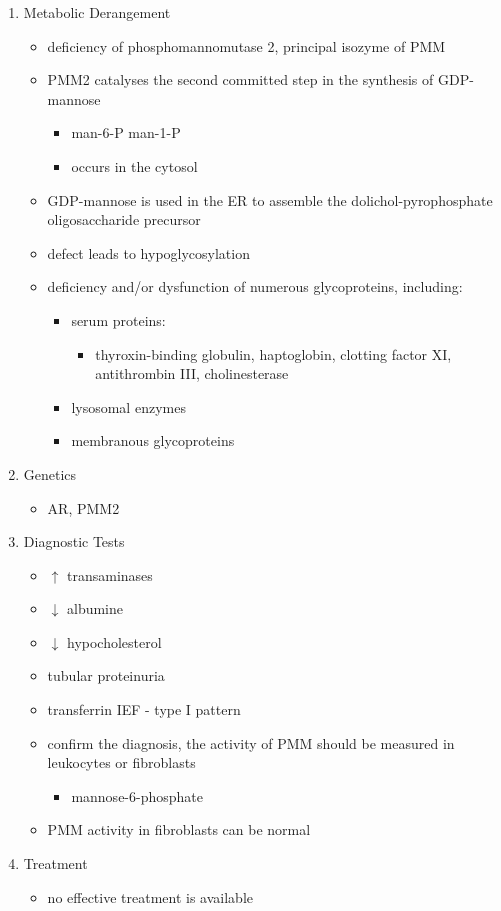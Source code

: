 \documentclass{scrartcl}
\begin{document}
\begin{enumerate}
\item Metabolic Derangement
\label{sec:org8d41dc3}
\begin{itemize}
\item deficiency of phosphomannomutase 2, principal isozyme of PMM
\item PMM2 catalyses the second committed step in the synthesis of GDP-mannose
\begin{itemize}
\item man-6-P \ce{<=>} man-1-P
\item occurs in the cytosol
\end{itemize}
\item GDP-mannose is used in the ER to assemble the dolichol-pyrophosphate
oligosaccharide precursor
\item defect leads to hypoglycosylation
\item deficiency and/or dysfunction of numerous glycoproteins, including:
\begin{itemize}
\item serum proteins:
\begin{itemize}
\item thyroxin-binding globulin, haptoglobin, clotting factor XI,
antithrombin III, cholinesterase
\end{itemize}
\item lysosomal enzymes
\item membranous glycoproteins
\end{itemize}
\end{itemize}

\item Genetics
\label{sec:org4516f24}
\begin{itemize}
\item AR, PMM2
\end{itemize}

\item Diagnostic Tests
\label{sec:orgd387493}
\begin{itemize}
\item \(\uparrow\) transaminases
\item \(\downarrow\) albumine
\item \(\downarrow\) hypocholesterol
\item tubular proteinuria
\item transferrin IEF - type I pattern
\item confirm the diagnosis, the activity of PMM should be measured in
leukocytes or fibroblasts
\begin{itemize}
\item\relax [2-H\(^{\text{3}}\)]mannose-6-phosphate
\end{itemize}
\item PMM activity in fibroblasts can be normal
\end{itemize}

\item Treatment
\label{sec:org5272330}
\begin{itemize}
\item no effective treatment is available
\end{itemize}
\end{enumerate}
\end{document}
